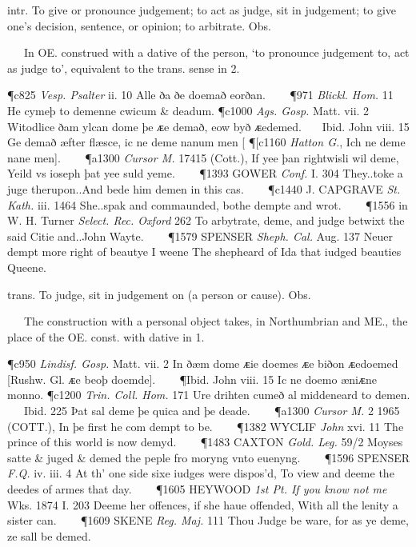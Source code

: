 \begin{description}[wide, labelwidth=!, labelindent=0pt]
\begin{myenumerate}

 intr. To give or pronounce judgement; to act as judge, sit in judgement; to give one's decision, sentence, or opinion; to arbitrate. Obs.

   In OE. construed with a dative of the person, ‘to pronounce judgement to, act as judge to’, equivalent to the trans. sense in 2.

\P c825 \textit{Vesp. Psalter} ii. 10 Alle ða ðe doemað eorðan.    
\P 971 \textit{Blickl. Hom.} 11 He cymeþ to demenne cwicum \& deadum.
\P c1000 \textit{Ags.  Gosp.} Matt. vii. 2 Witodlice ðam ylcan dome þe ᴁe demað, eow byð ᴁedemed.    Ibid. John viii. 15 Ge demað æfter flæsce, ic ne deme nanum men [
\P [c1160 \textit{Hatton  G.}, Ich ne deme nane men].    
\P a1300  \textit{Cursor M.} 17415 (Cott.), If yee þan rightwisli wil deme, Yeild vs ioseph þat yee suld yeme.    
\P 1393 GOWER  \textit{Conf.} I. 304 They..toke a juge therupon..And bede him demen in this cas.    
\P c1440 J. CAPGRAVE  \textit{St. Kath.} iii. 1464 She..spak and commaunded, bothe dempte and wrot.    
\P 1556 in  W. H. Turner \textit{Select. Rec. Oxford} 262 To arbytrate, deme, and judge betwixt the said Citie and..John Wayte.    
\P 1579 SPENSER  \textit{Sheph. Cal.} Aug. 137 Neuer dempt more right of beautye I weene The shepheard of Ida that iudged beauties Queene.

 trans. To judge, sit in judgement on (a person or cause). Obs.

   The construction with a personal object takes, in Northumbrian and ME., the place of the OE. const. with dative in 1.

\P c950 \textit{Lindisf. Gosp.} Matt. vii. 2 In ðæm dome ᴁie doemes ᴁe biðon ᴁedoemed [Rushw. Gl. ᴁe beoþ doemde].    
\P Ibid. John viii. 15 Ic ne doemo æniᴁne monno. 
\P c1200  \textit{Trin. Coll. Hom.} 171 Ure drihten cumeð al middeneard to demen.    Ibid. 225 Þat sal deme þe quica and þe deade.    
\P a1300  \textit{Cursor M.} 2 1965 (COTT.),  In þe first he com dempt to be.    
\P 1382 WYCLIF  \textit{John} xvi. 11 The prince of this world is now demyd.    
\P 1483 CAXTON  \textit{Gold. Leg.} 59/2 Moyses satte \& juged \& demed the peple fro moryng vnto euenyng.    
\P 1596 SPENSER  \textit{F.Q.} iv. iii. 4 At th' one side sixe iudges were dispos'd, To view and deeme the deedes of armes that day.    
\P 1605 HEYWOOD  \textit{1st Pt. If you know not me} Wks. 1874 I. 203  Deeme her offences, if she haue offended, With all the lenity a sister can.    
\P 1609 SKENE  \textit{Reg. Maj.} 111 Thou Judge be ware, for as ye deme, ze sall be demed.


\end{myenumerate}
\end{description}
